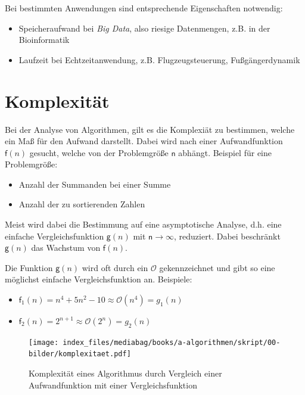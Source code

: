 \documentclass[
  letterpaper,
  DIV=11,
  numbers=noendperiod]{scrreprt}
\providecommand{\tightlist}{%
  \setlength{\itemsep}{0pt}\setlength{\parskip}{0pt}}\usepackage{longtable,booktabs,array}
\begin{document}
Bei bestimmten Anwendungen sind entsprechende Eigenschaften notwendig:

\begin{itemize}
\tightlist
\item
  Speicheraufwand bei \emph{Big Data}, also riesige Datenmengen, z.B. in
  der Bioinformatik
\item
  Laufzeit bei Echtzeitanwendung, z.B. Flugzeugsteuerung,
  Fußgängerdynamik
\end{itemize}

\section{Komplexität}\label{komplexituxe4t}

Bei der Analyse von Algorithmen, gilt es die Komplexiät zu bestimmen,
welche ein Maß für den Aufwand darstellt. Dabei wird nach einer
Aufwandfunktion \(\mathsf f(n)\) gesucht, welche von der Problemgröße
\(\mathsf n\) abhängt. Beispiel für eine Problemgröße:

\begin{itemize}
\tightlist
\item
  Anzahl der Summanden bei einer Summe
\item
  Anzahl der zu sortierenden Zahlen
\end{itemize}

Meist wird dabei die Bestimmung auf eine asymptotische Analyse, d.h.
eine einfache Vergleichsfunktion \(\mathsf g(n)\) mit
\(\mathsf n \rightarrow \infty\), reduziert. Dabei beschränkt
\(\mathsf g(n)\) das Wachstum von \(\mathsf f(n)\).

Die Funktion \(\mathsf g(n)\) wird oft durch ein \(\mathcal{O}\)
gekennzeichnet und gibt so eine möglichst einfache Vergleichsfunktion
an. Beispiele:

\begin{itemize}
\tightlist
\item
  \(\mathsf f_1(n) = n^4 + 5n^2 - 10 \approx \mathcal{O}(n^4) = g_1(n)\)
\item
  \(\mathsf f_2(n) = 2^{n+1} \approx \mathcal{O}(2^n) = g_2(n)\)
\end{itemize}

\begin{figure}[H]

{\centering \texttt{[image: index\_files/mediabag/books/a-algorithmen/skript/00-bilder/komplexitaet.pdf]}

}

\caption{Komplexität eines Algorithmus durch Vergleich einer
Aufwandfunktion mit einer Vergleichsfunktion}

\end{figure}%
\end{document}

